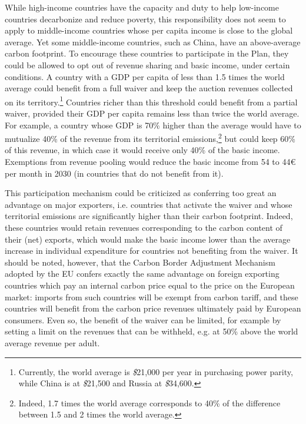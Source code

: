 \documentclass[a5paper,english,openany]{memoir}
\begin{document}
While high-income countries have the capacity and duty to help low-income countries decarbonize and reduce poverty, this responsibility does not seem to apply to middle-income countries whose per capita income is close to the global average. Yet some middle-income countries, such as China, have an above-average carbon footprint. To encourage these countries to participate in the Plan, they could be allowed to opt out of revenue sharing and basic income, under certain conditions. A country with a GDP per capita of less than 1.5 times the world average could benefit from a full waiver and keep the auction revenues collected on its territory.\footnote{Currently, the world average is \textit{\$}21,000 per year in purchasing power parity, while China is at \textit{\$}21,500 and Russia at \textit{\$}34,600.}  
Countries richer than this threshold could benefit from a partial waiver, provided their GDP per capita remains less than twice the world average. For example, a country whose GDP is 70\% higher than the average would have to mutualize 40\% of the revenue from its territorial emissions,\footnote{Indeed, 1.7 times the world average corresponds to 40\% of the difference between 1.5 and 2 times the world average.} but could keep 60\% of this revenue, in which case it would receive only 40\% of the basic income. Exemptions from revenue pooling would reduce the basic income from 54 to 44\euro{} per month in 2030 (in countries that do not benefit from it). 

This participation mechanism could be criticized as conferring too great an advantage on major exporters, i.e. countries that activate the waiver and whose territorial emissions are significantly higher than their carbon footprint. Indeed, these countries would retain revenues corresponding to the carbon content of their (net) exports, which would make the basic income lower than the average increase in individual expenditure for countries not benefiting from the waiver. It should be noted, however, that the Carbon Border Adjustment Mechanism adopted by the EU confers exactly the same advantage on foreign exporting countries which pay an internal carbon price equal to the price on the European market: imports from such countries will be exempt from carbon tariff, and these countries will benefit from the carbon price revenues ultimately paid by European consumers. Even so, the benefit of the waiver can be limited, for example by setting a limit on the revenues that can be withheld, e.g. at 50\% above the world average revenue per adult. %
\end{document}
